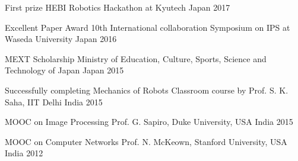



\begin{cvhonors}

  \cvhonor
    {First prize} %
    {HEBI Robotics Hackathon at Kyutech} %
    {Japan} %
    {2017} %

  \cvhonor
    {Excellent Paper Award} %
    {10th International collaboration Symposium on IPS at Waseda University} %
    {Japan} %
    {2016} %

  \cvhonor
    {MEXT Scholarship} %
    {Ministry of Education, Culture, Sports, Science and Technology of Japan} %
    {Japan} %
    {2015} %

  \cvhonor
    {Successfully completing Mechanics of Robots} %
    {Classroom course by Prof. S. K. Saha, IIT Delhi} %
    {India} %
    {2015} %

  \cvhonor
    {MOOC on Image Processing} %
    {Prof. G. Sapiro, Duke University, USA} %
    {India} %
    {2015} %

  \cvhonor
    {MOOC on Computer Networks} %
    {Prof. N. McKeown, Stanford University, USA} %
    {India} %
    {2012} %

\end{cvhonors}
%
%
